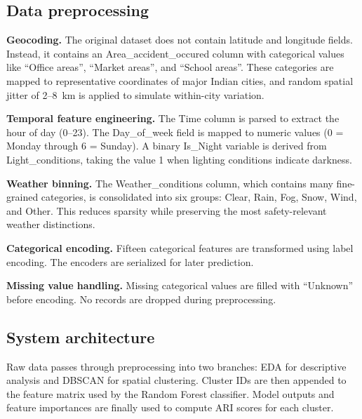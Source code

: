 \documentclass[conference]{IEEEtran}
\begin{document}
\subsection{Data preprocessing}

\textbf{Geocoding.} The original dataset does not contain latitude and longitude fields. Instead, it contains an Area\_accident\_occured column with categorical values like ``Office areas'', ``Market areas'', and ``School areas''. These categories are mapped to representative coordinates of major Indian cities, and random spatial jitter of 2--8~km is applied to simulate within-city variation.

\textbf{Temporal feature engineering.} The Time column is parsed to extract the hour of day (0--23). The Day\_of\_week field is mapped to numeric values (0 = Monday through 6 = Sunday). A binary Is\_Night variable is derived from Light\_conditions, taking the value 1 when lighting conditions indicate darkness.

\textbf{Weather binning.} The Weather\_conditions column, which contains many fine-grained categories, is consolidated into six groups: Clear, Rain, Fog, Snow, Wind, and Other. This reduces sparsity while preserving the most safety-relevant weather distinctions.

\textbf{Categorical encoding.} Fifteen categorical features are transformed using label encoding. The encoders are serialized for later prediction.

\textbf{Missing value handling.} Missing categorical values are filled with ``Unknown'' before encoding. No records are dropped during preprocessing.

\subsection{System architecture}

Raw data passes through preprocessing into two branches: EDA for descriptive analysis and DBSCAN for spatial clustering. Cluster IDs are then appended to the feature matrix used by the Random Forest classifier. Model outputs and feature importances are finally used to compute ARI scores for each cluster.
\end{document}
